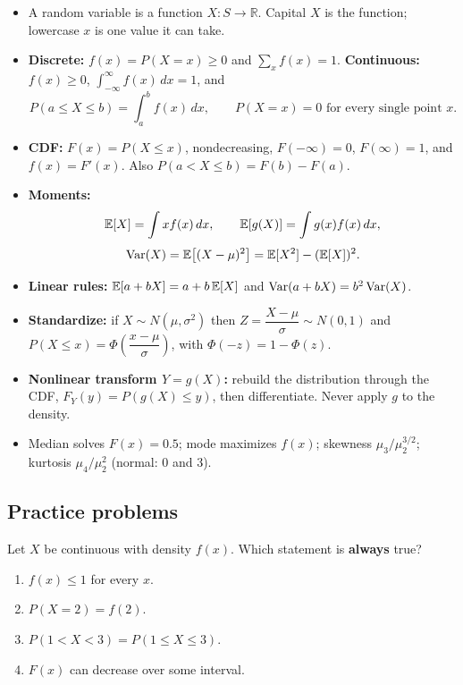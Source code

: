 \documentclass[11pt]{article}
\begin{document}
\begin{keybox}
\begin{itemize}
  \item A random variable is a function $X:S\to\mathbb{R}$. Capital $X$ is the function; lowercase $x$ is one value it can take.
  \item \textbf{Discrete:} $f(x)=P(X=x)\ge 0$ and $\sum_x f(x)=1$. \quad \textbf{Continuous:} $f(x)\ge 0$, $\int_{-\infty}^{\infty} f(x)\,dx=1$, and
  \[ P(a\le X\le b)=\int_a^b f(x)\,dx, \qquad P(X=x)=0 \text{ for every single point } x. \]
  \item \textbf{CDF:} $F(x)=P(X\le x)$, nondecreasing, $F(-\infty)=0$, $F(\infty)=1$, and $f(x)=F'(x)$. Also $P(a<X\le b)=F(b)-F(a)$.
  \item \textbf{Moments:}
  \[ \mathbb{E}[X]=\int x f(x)\,dx, \qquad \mathbb{E}[g(X)]=\int g(x)f(x)\,dx, \]\[ \operatorname{Var}(X)=\mathbb{E}\big[(X-\mu)^2\big]=\mathbb{E}[X^2]-(\mathbb{E}[X])^2. \]
  \item \textbf{Linear rules:} $\mathbb{E}[a+bX]=a+b\,\mathbb{E}[X]$ and $\operatorname{Var}(a+bX)=b^2\operatorname{Var}(X)$.
  \item \textbf{Standardize:} if $X\sim N(\mu,\sigma^2)$ then $Z=\dfrac{X-\mu}{\sigma}\sim N(0,1)$ and $P(X\le x)=\Phi\!\left(\dfrac{x-\mu}{\sigma}\right)$, with $\Phi(-z)=1-\Phi(z)$.
  \item \textbf{Nonlinear transform $Y=g(X)$:} rebuild the distribution through the CDF, $F_Y(y)=P(g(X)\le y)$, then differentiate. Never apply $g$ to the density.
  \item Median solves $F(x)=0.5$; mode maximizes $f(x)$; skewness $\mu_3/\mu_2^{3/2}$; kurtosis $\mu_4/\mu_2^2$ (normal: 0 and 3).
\end{itemize}
\end{keybox}

\subsection{Practice problems}
\setcounter{prob}{0}

Let $X$ be continuous with density $f(x)$. Which statement is \textbf{always} true?
\begin{enumerate}[label=(\alph*)]
  \item $f(x)\le 1$ for every $x$.
  \item $P(X=2)=f(2)$.
  \item $P(1<X<3)=P(1\le X\le 3)$.
  \item $F(x)$ can decrease over some interval.
\end{enumerate}
\end{document}

